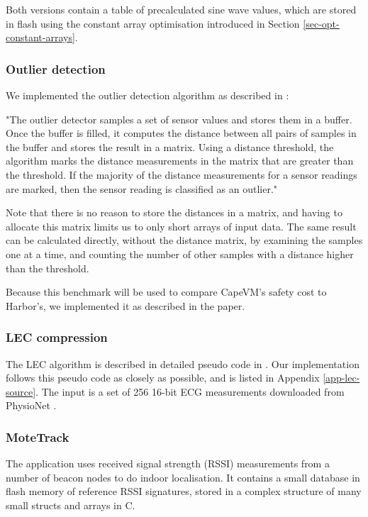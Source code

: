 Both versions contain a table of precalculated sine wave values, which are stored in flash using the constant array optimisation introduced in Section \ref{sec-opt-constant-arrays}.

\subsubsection{Outlier detection}
We implemented the outlier detection algorithm as described in \cite{Kumar:2007ge}:

\begin{displayquote}
"The outlier detector samples a set of sensor values and stores them in a buffer. Once the buffer is filled, it computes the distance between all pairs of samples in the buffer and stores the result in a matrix. Using a distance threshold, the algorithm marks the distance measurements in the matrix that are greater than the threshold. If the majority of the distance measurements for a sensor readings are marked, then the sensor reading is classified as an outlier."
\end{displayquote}

Note that there is no reason to store the distances in a matrix, and having to allocate this matrix limits us to only short arrays of input data. The same result can be calculated directly, without the distance matrix, by examining the samples one at a time, and counting the number of other samples with a distance higher than the threshold.

Because this benchmark will be used to compare CapeVM's safety cost to Harbor's, we implemented it as described in the paper.

\subsubsection{LEC compression}
The LEC algorithm is described in detailed pseudo code in \cite{Marcelloni:2009ja}. Our implementation follows this pseudo code as closely as possible, and is listed in Appendix \ref{app-lec-source}. The input is a set of 256 16-bit ECG measurements downloaded from PhysioNet \cite{physionet-ecg-data}.

\subsubsection{MoteTrack}
\label{sec-evaluation-benchmark-implementation-motetrack}
The  application uses received signal strength (RSSI) measurements from a number of beacon nodes to do indoor localisation. It contains a small database in flash memory of reference RSSI signatures, stored in a complex structure of many small structs and arrays in C.

